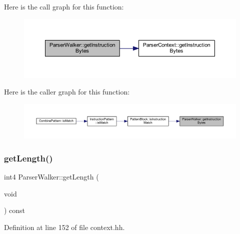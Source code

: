 Here is the call graph for this function\+:
\nopagebreak
\begin{figure}[H]
\begin{center}
\leavevmode
\includegraphics[width=350pt]{class_parser_walker_ad986695377d62eeb98db856c34db6aa7_cgraph}
\end{center}
\end{figure}
Here is the caller graph for this function\+:
\nopagebreak
\begin{figure}[H]
\begin{center}
\leavevmode
\includegraphics[width=350pt]{class_parser_walker_ad986695377d62eeb98db856c34db6aa7_icgraph}
\end{center}
\end{figure}
\mbox{\label{class_parser_walker_a77de14662fd97ff54b79b510dcdd7f1d}} 
\subsubsection{\texorpdfstring{getLength()}{getLength()}}
{\footnotesize\ttfamily int4 Parser\+Walker\+::get\+Length (\begin{DoxyParamCaption}\item[{void}]{ }\end{DoxyParamCaption}) const\hspace{0.3cm}{\ttfamily [inline]}}



Definition at line 152 of file context.\+hh.

